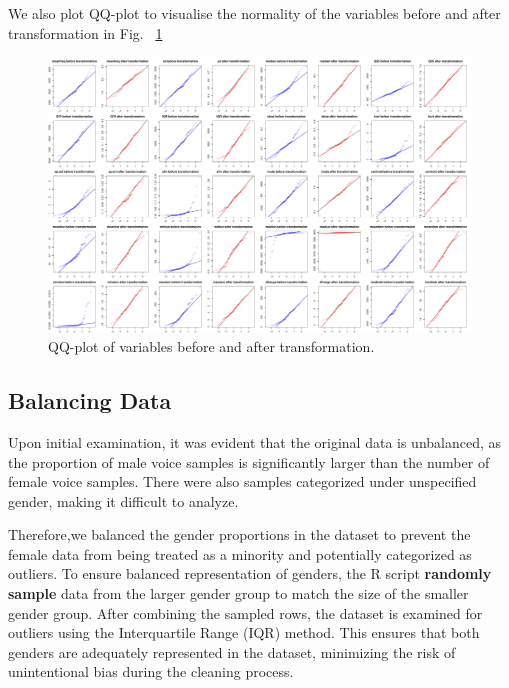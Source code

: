 \documentclass{article}
\begin{document}
	We also plot QQ-plot to visualise the normality of the variables before and after transformation in Fig. ~\ref{transformation_qq}
	\begin{figure}
		\centering
		\includegraphics[width=\textwidth]{graphs/transformations_qq.pdf}
		\caption{QQ-plot of variables before and after transformation.}
		\label{transformation_qq}
	\end{figure}
	
	\subsection{Balancing Data}
	Upon initial examination, it was evident that the original data is unbalanced, as the proportion of male voice samples is significantly larger than the number of female voice samples. There were also samples categorized under unspecified gender, making it difficult to analyze. 
	
	Therefore,we balanced the gender proportions in the dataset to prevent the female data from being treated as a minority and potentially categorized as outliers. To ensure balanced representation of genders, the R script \textbf{randomly sample} data from the larger gender group to match the size of the smaller gender group. After combining the sampled rows, the dataset is examined for outliers using the Interquartile Range (IQR) method. This ensures that both genders are adequately represented in the dataset, minimizing the risk of unintentional bias during the cleaning process. 
	
\end{document}
